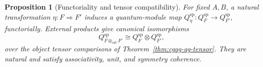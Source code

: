 \documentclass[oneside]{article}
\newcommand{\extprod}{\mathbin{\otimes_{\mathrm{ext}}}}
\theoremstyle{plain}
\newtheorem{proposition}[theorem]{Proposition}
\theoremstyle{definition}
\theoremstyle{remark}
\begin{document}
\begin{proposition}[Functoriality and tensor compatibility]
\label{prop:cgqg-distributor-qmodule-functorial}
\label{prop:cgqg-distributor-qmodule-tensor}
For fixed \(A,B\), a natural transformation \(\eta:F\Rightarrow F'\)
induces a quantum-module map
\(Q_\eta^{\mathrm{sp}}:Q_F^{\mathrm{sp}}\to Q_{F'}^{\mathrm{sp}}\),
functorially. External products give canonical isomorphisms
\begin{equation}
 Q_{F\extprod F'}^{\mathrm{sp}}
   \cong Q_F^{\mathrm{sp}}\otimes Q_{F'}^{\mathrm{sp}},
 \label{eq:cgqg-distributor-qmodule-tensor}
\end{equation}
over the object tensor comparisons of Theorem~\ref{thm:cgqg-qg-tensor}.
They are natural and satisfy associativity, unit, and symmetry coherence.
\end{proposition}
\end{document}
